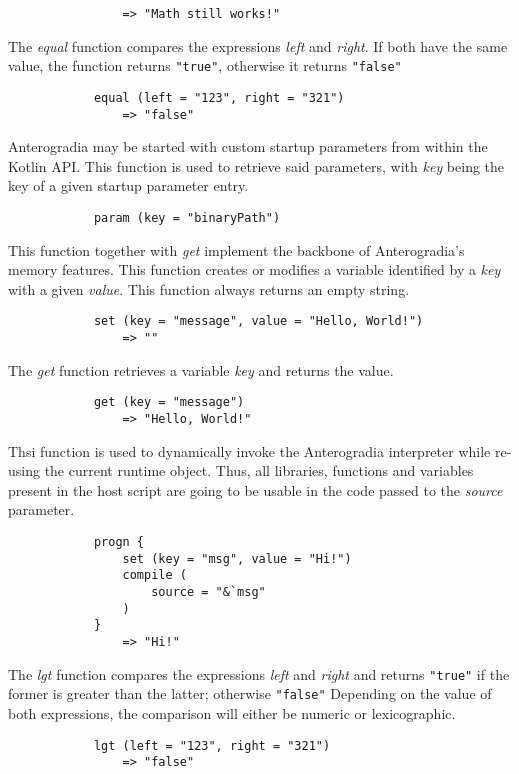 \begin{multicols*}{2}
\begin{verbatim}
			    => "Math still works!"
	\end{verbatim}
	\spacing
	The \textit{equal} function compares the expressions \textit{left} and \textit{right}. If both have the same value,
	the function returns \verb|"true"|, otherwise it returns \verb|"false"|
	\begin{verbatim}
			equal (left = "123", right = "321")
			    => "false"
	\end{verbatim}
	\spacing
	Anterogradia may be started with custom startup parameters from within the Kotlin API. This function is used to retrieve said parameters,
	with \textit{key} being the key of a given startup parameter entry.
	\begin{verbatim}
			param (key = "binaryPath")
	\end{verbatim}
	\columnbreak
	This function together with \textit{get} implement the backbone of Anterogradia's memory features. This function creates or modifies
	a variable identified by a \textit{key} with a given \textit{value}. This function always returns an empty string.
	\begin{verbatim}
			set (key = "message", value = "Hello, World!")
			    => ""
	\end{verbatim}
	\spacing
	The \textit{get} function retrieves a variable \textit{key} and returns the value.
	\begin{verbatim}
			get (key = "message")
			    => "Hello, World!"
	\end{verbatim}
	\spacing
	Thsi function is used to dynamically invoke the Anterogradia interpreter while re-using the current runtime object. Thus, all
	libraries, functions and variables present in the host script are going to be usable in the code passed to the \textit{source}
	parameter.
	\begin{verbatim}
			progn {
			    set (key = "msg", value = "Hi!")
			    compile (
			        source = "&`msg"
			    )
			}
			    => "Hi!"
	\end{verbatim}
	The \textit{lgt} function compares the expressions \textit{left} and \textit{right} and returns \verb|"true"| if
	the former is greater than the latter; otherwise \verb|"false"| Depending on the value of both expressions, the comparison will either be
	numeric or lexicographic.
	\begin{verbatim}
			lgt (left = "123", right = "321")
			    => "false"
	\end{verbatim}

\end{multicols*}

